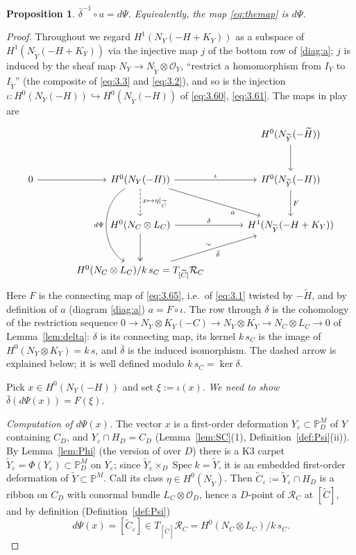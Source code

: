 \documentclass[11pt,reqno]{amsart}
\theoremstyle{plain}
\newtheorem{proposition}[theorem]{Proposition}
\theoremstyle{definition}
\newcommand{\PM}{\mathbb{P}^M}
\newcommand{\OO}{\mathcal{O}}
\newcommand{\Yt}{\widetilde{Y}}
\newcommand{\Ht}{\widetilde{H}}
\newcommand{\Ct}{\widetilde{C}}
\newcommand{\NY}{N_{Y}}
\newcommand{\NYt}{N_{\Yt}}
\newcommand{\RC}{\mathcal{R}_C}
\newcommand{\Dd}{D}
\begin{document}
\begin{proposition}\label{prop:a=dPsi}
$\bar\delta^{-1} \circ a= d\Psi$. Equivalently, the map \eqref{eq:themap} is $d\Psi$.
\end{proposition}

\begin{proof}
Throughout we regard $H^1(\NY(-H+K_Y))$ as a subspace of $H^1(\NYt(-H+K_Y))$ via the injective map $j$ of the bottom row of \eqref{diag:a}; $j$ is induced by the sheaf map $\NY\to\NYt\otimes\OO_Y$, ``restrict a homomorphism from $I_Y$ to $I_{\Yt}$'' (the composite of \eqref{eq:3.3} and \eqref{eq:3.2}), and so is the injection $\iota\colon H^0(\NY(-H))\hookrightarrow H^0(\NYt(-H))$ of \eqref{eq:3.60}, \eqref{eq:3.61}. The maps in play are
\begin{equation}\label{diag:overview}
\begin{tikzcd}[column sep=large, row sep=large]
&& H^0(\NYt(-\Ht))\arrow[d]\\
0\arrow[r] & H^0(\NY(-H))\arrow[r,"\iota"]\arrow[d,dashed,"x\mapsto\eta|_{\Ct}"]\arrow[dr,"a"' near end]\arrow[dd,bend right=60,"d\Psi"'] & H^0(\NYt(-H))\arrow[d,"F"]\\
& H^0(N_C\otimes L_C)\arrow[r,"\delta"]\arrow[d,two heads] & H^1(\NYt(-H+K_Y))\\
& H^0(N_C\otimes L_C)/k\,s_C=T_{[\Ct]}\RC\arrow[ur,"\bar\delta"',"\sim"] &
\end{tikzcd}
\end{equation}
Here $F$ is the connecting map of \eqref{eq:3.65}, i.e.\ of \eqref{eq:3.1} twisted by $-\Ht$, and by definition of $a$ (diagram \eqref{diag:a}) $a=F\circ\iota$. The row through $\delta$ is the cohomology of the restriction sequence $0\to\NY\otimes K_Y(-C)\to\NY\otimes K_Y\to N_C\otimes L_C\to0$ of Lemma~\ref{lem:delta}: $\delta$ is its connecting map, its kernel $k\,s_C$ is the image of $H^0(\NY\otimes K_Y)=k\,s$, and $\bar\delta$ is the induced isomorphism. The dashed arrow is explained below; it is well defined modulo $k\,s_C=\ker\delta$.

Pick $x\in H^0(\NY(-H))$ and set $\xi:=\iota(x)$. \emph{We need to show $\bar\delta(d\Psi(x))=F(\xi)$.}

\emph{Computation of $d\Psi(x)$.} The vector $x$ is a first-order deformation $Y_\varepsilon\subset\PM_\Dd$ of $Y$ containing $C_\Dd$, and $Y_\varepsilon\cap H_\Dd=C_\Dd$ (Lemma~\ref{lem:SC}(1), Definition~\ref{def:Psi}(ii)). By Lemma~\ref{lem:Phi} (the version of \cite[Prop.~3.7]{GP97} over $\Dd$) there is a K3 carpet $\Yt_\varepsilon=\Phi(Y_\varepsilon)\subset\PM_\Dd$ on $Y_\varepsilon$; since $\Yt_\varepsilon\times_\Dd\operatorname{Spec}k=\Yt$, it is an embedded first-order deformation of $\Yt\subset\PM$. Call its class $\eta\in H^0(\NYt)$. Then $\Ct_\varepsilon:=\Yt_\varepsilon\cap H_\Dd$ is a ribbon on $C_\Dd$ with conormal bundle $L_C\otimes\OO_\Dd$, hence a $\Dd$-point of $\RC$ at $[\Ct]$, and by definition (Definition~\ref{def:Psi})
\[
d\Psi(x)=[\Ct_\varepsilon]\in T_{[\Ct]}\RC=H^0(N_C\otimes L_C)/k\,s_C .
\]


\end{proof}
\end{document}
